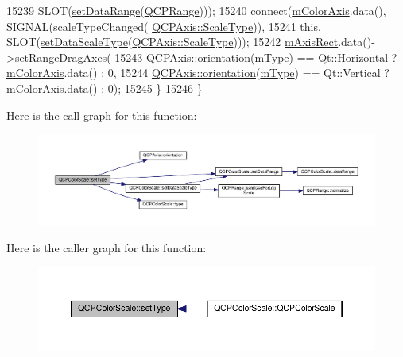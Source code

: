 \begin{DoxyCode}
15239             SLOT(\hyperlink{class_q_c_p_color_scale_abe88633003a26d1e756aa74984587fef}{setDataRange}(\hyperlink{class_q_c_p_range}{QCPRange})));
15240     connect(\hyperlink{class_q_c_p_color_scale_a2efbc90fd31898fe05d2b74a8422b1d5}{mColorAxis}.data(), SIGNAL(scaleTypeChanged(
      \hyperlink{class_q_c_p_axis_a36d8e8658dbaa179bf2aeb973db2d6f0}{QCPAxis::ScaleType})),
15241             \textcolor{keyword}{this}, SLOT(\hyperlink{class_q_c_p_color_scale_aeb6107d67dd7325145b2498abae67fc3}{setDataScaleType}(\hyperlink{class_q_c_p_axis_a36d8e8658dbaa179bf2aeb973db2d6f0}{QCPAxis::ScaleType})));
15242     \hyperlink{class_q_c_p_color_scale_a6e37f7d49cd614dc50ef1caae60461b9}{mAxisRect}.data()->setRangeDragAxes(
15243         \hyperlink{class_q_c_p_axis_a57483f2f60145ddc9e63f3af53959265}{QCPAxis::orientation}(\hyperlink{class_q_c_p_color_scale_a7d47ed4ab76f38e50164e9d77fe33789}{mType}) == Qt::Horizontal ? 
      \hyperlink{class_q_c_p_color_scale_a2efbc90fd31898fe05d2b74a8422b1d5}{mColorAxis}.data() : 0,
15244         \hyperlink{class_q_c_p_axis_a57483f2f60145ddc9e63f3af53959265}{QCPAxis::orientation}(\hyperlink{class_q_c_p_color_scale_a7d47ed4ab76f38e50164e9d77fe33789}{mType}) == Qt::Vertical ? 
      \hyperlink{class_q_c_p_color_scale_a2efbc90fd31898fe05d2b74a8422b1d5}{mColorAxis}.data() : 0);
15245   \}
15246 \}
\end{DoxyCode}


Here is the call graph for this function\+:\nopagebreak
\begin{figure}[H]
\begin{center}
\leavevmode
\includegraphics[width=350pt]{class_q_c_p_color_scale_a1bf9bdb291927c422dd66b404b206f1f_cgraph}
\end{center}
\end{figure}




Here is the caller graph for this function\+:\nopagebreak
\begin{figure}[H]
\begin{center}
\leavevmode
\includegraphics[width=350pt]{class_q_c_p_color_scale_a1bf9bdb291927c422dd66b404b206f1f_icgraph}
\end{center}
\end{figure}


